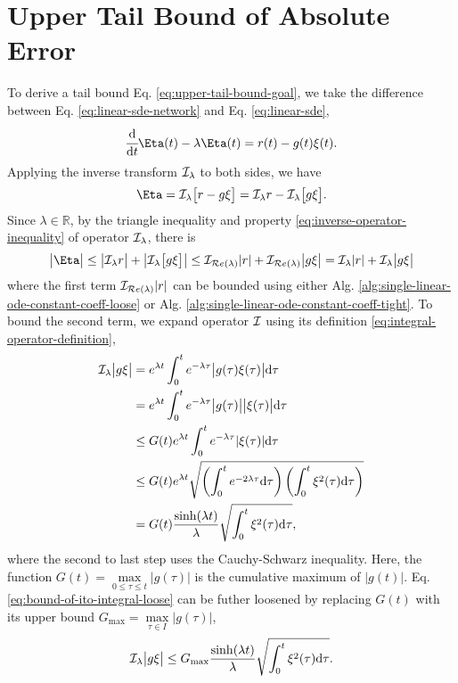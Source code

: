 \section{Upper Tail Bound of Absolute Error}
    To derive a tail bound Eq. \eqref{eq:upper-tail-bound-goal}, we take the difference between Eq. \eqref{eq:linear-sde-network} and Eq. \eqref{eq:linear-sde},
    \begin{equation}
        \dt{}\Eta(t)  - \lambda \Eta(t) = r(t) - g(t) \xi(t).
    \end{equation}
    Applying the inverse transform $\mathcal{I}_{\lambda}$ to both sides, we have
    \begin{equation}
        \Eta = \I_{\lambda} \big[ r - g \xi \big] = \I_{\lambda} r - \I_{\lambda} \big[g \xi \big].
    \end{equation}
    Since $\lambda \in \mathbb{R}$, by the triangle inequality and property \eqref{eq:inverse-operator-inequality} of operator $\mathcal{I}_{\lambda}$, there is
    \begin{equation}\label{eq:eta-bound-unevaluated}
        \big|\Eta\big| \leq \big|\I_{\lambda} r\big| + \big|\I_{\lambda} \big[g \xi \big]\big| \leq \I_{\Re{\lambda}} |r| + \I_{\Re{\lambda}} \big|g \xi \big| = \I_{\lambda} |r| + \I_{\lambda} \big|g \xi \big| 
    \end{equation}
    where the first term $\mathcal{I}_{\mathcal{R}e\left(\lambda\right)} |r|$ can be bounded using either Alg. \ref{alg:single-linear-ode-constant-coeff-loose} or Alg. \ref{alg:single-linear-ode-constant-coeff-tight}.
    To bound the second term, we expand operator $\mathcal{I}$ using its definition \eqref{eq:integral-operator-definition},
    \begin{align}
        \mathcal{I}_{\lambda} \big|g \xi \big| &= e^{\lambda t}\int_0^t e^{-\lambda\tau} \big|g(\tau) \xi(\tau)\big| \mathrm{d}\tau \\
        & = e^{\lambda t}\int_0^t e^{-\lambda\tau} \big|g(\tau)\big| \big|\xi(\tau)\big| \mathrm{d}\tau \\
        & \leq G(t) e^{\lambda t} \int_0^t e^{-\lambda\tau} |\xi(\tau)| \mathrm{d}\tau \\
        & \leq G(t) e^{\lambda t}  \sqrt{\left(\int_0^t e^{-2\lambda\tau} \mathrm{d}\tau\right)\left(\int_0^t\xi^2(\tau) \mathrm{d}\tau\right)} \\
        &= G(t) \frac{\sinh(\lambda t)}{\lambda} \sqrt{\int_0^t \xi^2(\tau) \mathrm{d}\tau}, \label{eq:bound-of-ito-integral-loose}
    \end{align}
    where the second to last step uses the Cauchy-Schwarz inequality.
    Here, the function $G(t) = \max\limits_{0 \leq \tau \leq t} |g(\tau)|$ is the cumulative maximum of $|g(t)|$. Eq. \eqref{eq:bound-of-ito-integral-loose} can be futher loosened by replacing $G(t)$ with its upper bound $G_{\max} = \max\limits_{\tau \in I} |g(\tau)|$,
    \begin{equation} \label{eq:bound-of-ito-integral-tight}
        \mathcal{I}_{\lambda} \big|g \xi \big| \leq G_{\max} \frac{\sinh(\lambda t)}{\lambda} \sqrt{\int_0^t \xi^2(\tau) \mathrm{d}\tau}.
    \end{equation}

